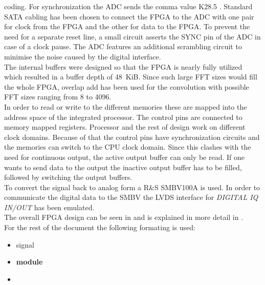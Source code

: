 \documentclass[11pt,technote,a4paper,onecolumn,dvips]{IEEEtran}
\newcommand{\signal}[1]{{\ttfamily #1}}
\newcommand{\module}[1]{{\ttfamily\bfseries #1}}
\newcommand{\clk}[1]{{\itshape\ttfamily #1}}
\begin{document}
coding. For synchronization the ADC sends the comma value K28.5
\cite{ltc2274}. Standard
SATA cabling has been chosen to connect the FPGA to the ADC with one pair
for clock from the FPGA and the other for data to the FPGA. To prevent the
need for a separate reset line, a small circuit asserts the SYNC pin of the
ADC in case of a clock pause. The ADC features an additional scrambling
circuit to minimise the noise caused by the digital interface.\\
The internal buffers were designed so that the FPGA is nearly fully utilized
which resulted in a buffer depth of \SI{48}{KiB}. Since such large FFT sizes
would fill the whole FPGA, overlap add has been used for the convolution with
possible FFT sizes ranging from 8 to 4096.\\
In order to read or write to the different memories these are mapped into the
address space of the integrated processor. The control pins are connected to
memory mapped registers. Processor and the rest of design work on different
clock domains. Because of that the control pins have synchronization circuits
and the memories can switch to the CPU clock domain. Since this clashes with
the need for continuous output, the active output buffer can only be read. If
one wants to send data to the output the inactive output buffer has to be
filled, followed by switching the output buffers.\\
To convert the signal back to analog form a R\&S SMBV100A is used. In order to
communicate the digital data to the SMBV the LVDS interface for
\emph{DIGITAL IQ IN/OUT} has been emulated.\\
The overall FPGA design can be seen in  and is 
explained in more detail in .\\
For the rest of the document the following formating is used:
\begin{itemize}
    \item \signal{signal}
    \item \module{module}
    \item \clk{}
\end{itemize}
\end{document}

